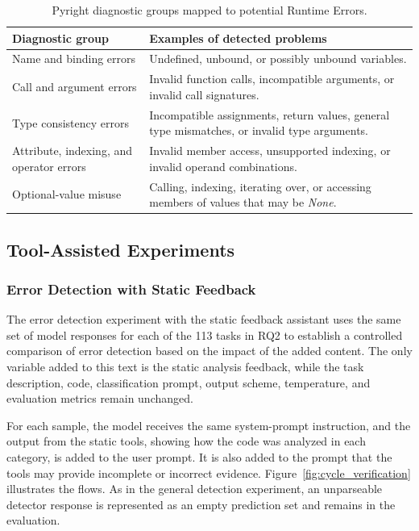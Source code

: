 \begin{table}[htbp]
\centering
\caption{Pyright diagnostic groups mapped to potential Runtime Errors.}
\label{tab:pyright_runtime_groups}
\begin{tabular}{@{}p{}@{}p{}@{}}
\toprule
\textbf{Diagnostic group} & \textbf{Examples of detected problems} \\
\midrule
Name and binding errors &
Undefined, unbound, or possibly unbound variables. \\
\midrule
Call and argument errors &
Invalid function calls, incompatible arguments, or invalid call signatures. \\
\midrule
Type consistency errors &
Incompatible assignments, return values, general type mismatches, or invalid type arguments. \\
\midrule
Attribute, indexing, and operator errors &
Invalid member access, unsupported indexing, or invalid operand combinations. \\
\midrule
Optional-value misuse &
Calling, indexing, iterating over, or accessing members of values that may be \emph{None}. \\
\bottomrule
\end{tabular}
\end{table}

\subsection{Tool-Assisted Experiments}
\label{sec:interactive_cycles}

\subsubsection{Error Detection with Static Feedback}

The error detection experiment with the static feedback assistant uses the same set of model responses for each of the 113 tasks in RQ2 to establish a controlled comparison of error detection based on the impact of the added content. The only variable added to this text is the static analysis feedback, while the task description, code, classification prompt, output scheme, temperature, and evaluation metrics remain unchanged.

For each sample, the model receives the same system-prompt instruction, and the output from the static tools, showing how the code was analyzed in each category, is added to the user prompt. It is also added to the prompt that the tools may provide incomplete or incorrect evidence. Figure~\ref{fig:cycle_verification} illustrates the flows. As in the general detection experiment, an unparseable detector response is represented as an empty prediction set and remains in the evaluation.

